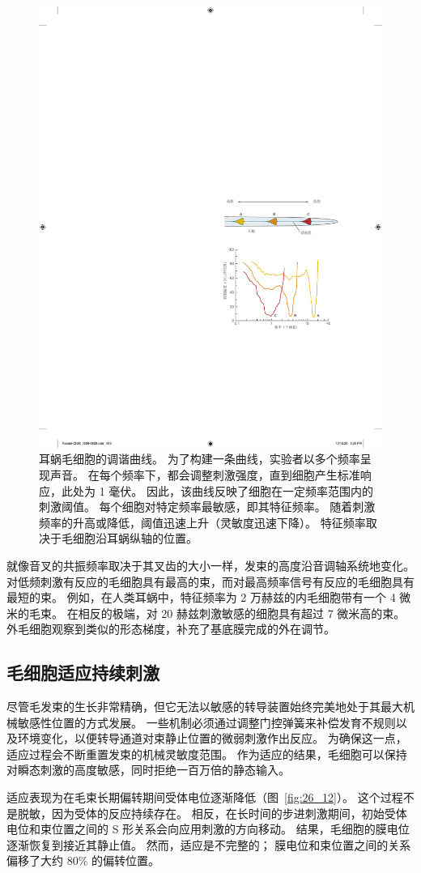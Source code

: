 \begin{figure}[htbp]
	\centering
	\includegraphics[width=0.6\linewidth]{chap26/fig_26_11}
	\caption{耳蜗毛细胞的调谐曲线。
		为了构建一条曲线，实验者以多个频率呈现声音。
		在每个频率下，都会调整刺激强度，直到细胞产生标准响应，此处为 1 毫伏。
		因此，该曲线反映了细胞在一定频率范围内的刺激阈值。
		每个细胞对特定频率最敏感，即其特征频率。
		随着刺激频率的升高或降低，阈值迅速上升（灵敏度迅速下降）。
		特征频率取决于毛细胞沿耳蜗纵轴的位置。}
	\label{fig:26_11}
\end{figure}


就像音叉的共振频率取决于其叉齿的大小一样，发束的高度沿音调轴系统地变化。
对低频刺激有反应的毛细胞具有最高的束，而对最高频率信号有反应的毛细胞具有最短的束。
例如，在人类耳蜗中，特征频率为 2 万赫兹的内毛细胞带有一个 4 微米的毛束。
在相反的极端，对 20 赫兹刺激敏感的细胞具有超过 7 微米高的束。
外毛细胞观察到类似的形态梯度，补充了基底膜完成的外在调节。



\subsection{毛细胞适应持续刺激}

尽管毛发束的生长非常精确，但它无法以敏感的转导装置始终完美地处于其最大机械敏感性位置的方式发展。
一些机制必须通过调整门控弹簧来补偿发育不规则以及环境变化，以便转导通道对束静止位置的微弱刺激作出反应。
为确保这一点，适应过程会不断重置发束的机械灵敏度范围。
作为适应的结果，毛细胞可以保持对瞬态刺激的高度敏感，同时拒绝一百万倍的静态输入。


适应表现为在毛束长期偏转期间受体电位逐渐降低（图~\ref{fig:26_12}）。
这个过程不是脱敏，因为受体的反应持续存在。
相反，在长时间的步进刺激期间，初始受体电位和束位置之间的 S 形关系会向应用刺激的方向移动。
结果，毛细胞的膜电位逐渐恢复到接近其静止值。
然而，适应是不完整的；
膜电位和束位置之间的关系偏移了大约 80\% 的偏转位置。


